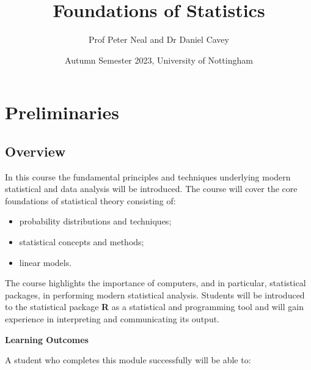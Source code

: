 \documentclass[
]{book}
\title{Foundations of Statistics}
\author{Prof Peter Neal and Dr Daniel Cavey}
\date{Autumn Semester 2023, University of Nottingham}
\providecommand{\tightlist}{%
  \setlength{\itemsep}{0pt}\setlength{\parskip}{0pt}}
\begin{document}
\maketitle

{
\setcounter{tocdepth}{1}
\tableofcontents
}
\hypertarget{preliminaries}{%
\chapter*{Preliminaries}\label{preliminaries}}

\hypertarget{overview}{%
\section*{Overview}\label{overview}}

In this course the fundamental principles and techniques underlying modern statistical and data analysis will be introduced. The course will cover the core foundations of statistical theory consisting of:

\begin{itemize}
\tightlist
\item
  probability distributions and techniques;\\
\item
  statistical concepts and methods;\\
\item
  linear models.
\end{itemize}

The course highlights the importance of computers, and in particular, statistical packages, in performing modern statistical analysis. Students will be introduced to the statistical package \textbf{R} as a statistical and programming tool and will gain experience in interpreting and communicating its output.

\textbf{Learning Outcomes}

A student who completes this module successfully will be able to:
\end{document}

